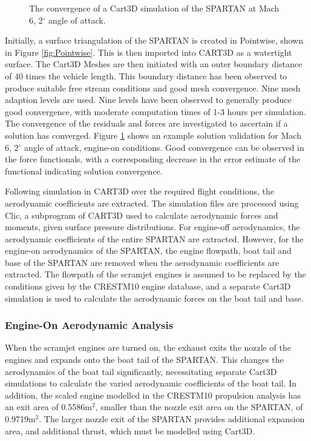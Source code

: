 \begin{figure}[ht]
\begin{subfigure}{.5\textwidth}
	\end{subfigure}
	
	\caption{The convergence of a Cart3D simulation of the SPARTAN at Mach 6, 2$^\circ$ angle of attack.}
	\label{fig:Cart3dValidation}
\end{figure}

Initially, a surface triangulation of the SPARTAN is created in Pointwise, shown in Figure \ref{fig:Pointwise}. This is then imported into CART3D as a watertight surface. 
The Cart3D Meshes are then initiated with an outer boundary distance of 40 times the vehicle length. This boundary distance has been observed to produce suitable free stream conditions and good mesh convergence. Nine mesh adaption levels are used. Nine levels have been observed to generally produce good convergence, with moderate computation times of 1-3 hours per simulation. The convergence of the residuals and forces are investigated to ascertain if a solution has converged. Figure \ref{fig:Cart3dValidation} shows an example solution validation for Mach 6, 2$^\circ$ angle of attack, engine-on conditions. Good convergence can be observed in the force functionals, with a corresponding decrease in the error estimate of the functional indicating solution convergence.  

Following simulation in CART3D over the required flight conditions, the aerodynamic coefficients are extracted. The simulation files are processed using Clic, a subprogram of CART3D used to calculate aerodynamic forces and moments, given surface pressure distributions. 
For engine-off aerodynamics, the aerodynamic coefficients of the entire SPARTAN are extracted. However, for the engine-on aerodynamics of the SPARTAN, the engine flowpath, boat tail and base of the SPARTAN are removed when the aerodynamic coefficients are extracted. The flowpath of the scramjet engines is assumed to be replaced by the conditions given by the \textsf{CRESTM10} engine database, and a separate Cart3D simulation is used to calculate the aerodynamic forces on the boat tail and base. 



\subsubsection{Engine-On Aerodynamic Analysis}\label{sec:engine-oncart}

When the scramjet engines are turned on, the exhaust exits the nozzle of the engines and expands onto the boat tail of the SPARTAN. This changes the aerodynamics of the boat tail significantly, necessitating separate Cart3D simulations to calculate the varied aerodynamic coefficients of the boat tail. In addition, 
the scaled engine modelled in the \textsf{CRESTM10} propulsion analysis has an exit area of 0.5586m$^2$, smaller than the nozzle exit area on the SPARTAN, of 0.9719m$^2$. The larger nozzle exit of the SPARTAN provides additional expansion area, and additional thrust, which must be modelled using Cart3D. 

